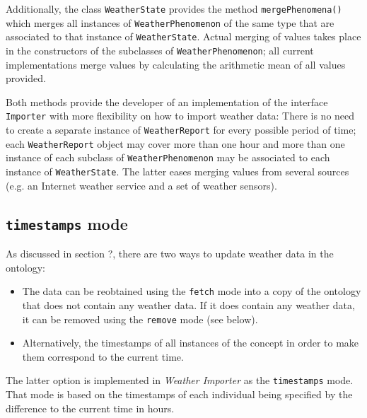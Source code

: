 Additionally, the class \texttt{WeatherState} provides the method \texttt{mergePhenomena()} which merges all instances of \texttt{WeatherPhenomenon} of the same type that are associated to that instance of \texttt{WeatherState}. Actual merging of values takes place in the constructors of the subclasses of \texttt{WeatherPhenomenon}; all current implementations merge values by calculating the arithmetic mean of all values provided\cite{maths}.

Both methods provide the developer of an implementation of the interface \texttt{Importer} with more flexibility on how to import weather data: There is no need to create a separate instance of \texttt{WeatherReport} for every possible period of time; each \texttt{WeatherReport} object may cover more than one hour and more than one instance of each subclass of \texttt{WeatherPhenomenon} may be associated to each instance of \texttt{WeatherState}. The latter eases merging values from several sources (e.g. an Internet weather service and a set of weather sensors).

\subsection{\texttt{timestamps} mode}

As discussed in section ?, there are two ways to update weather data in the \thinkhomeweather ontology:
\begin{itemize}
  \item The data can be reobtained using the \texttt{fetch} mode into a copy of the ontology that does not contain any weather data. If it does contain any weather data, it can be removed using the \texttt{remove} mode (see below).
  \item Alternatively, the timestamps of all instances of the  concept in order to make them correspond to the current time.
\end{itemize}

The latter option is implemented in \emph{Weather Importer} as the \texttt{timestamps} mode. That mode is based on the timestamps of each  individual being specified by the difference to the current time in hours.

